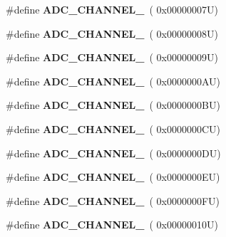 \begin{DoxyCompactItemize}
\#define {\bfseries A\+D\+C\+\_\+\+C\+H\+A\+N\+N\+E\+L\+\_}~( 0x00000007\+U)
\item 
\mbox{\label{group___a_d_c__channels_gab0917f6b66213f33f2e2ea8781df5aa9}} 
\#define {\bfseries A\+D\+C\+\_\+\+C\+H\+A\+N\+N\+E\+L\+\_}~( 0x00000008\+U)
\item 
\mbox{\label{group___a_d_c__channels_ga95f485ecc05187c3d475238a88beef1c}} 
\#define {\bfseries A\+D\+C\+\_\+\+C\+H\+A\+N\+N\+E\+L\+\_}~( 0x00000009\+U)
\item 
\mbox{\label{group___a_d_c__channels_gaa55df8c97225d32b495959896897567c}} 
\#define {\bfseries A\+D\+C\+\_\+\+C\+H\+A\+N\+N\+E\+L\+\_}~( 0x0000000\+A\+U)
\item 
\mbox{\label{group___a_d_c__channels_gaf36361a33c07b04f8ab1d58d232bc434}} 
\#define {\bfseries A\+D\+C\+\_\+\+C\+H\+A\+N\+N\+E\+L\+\_}~( 0x0000000\+B\+U)
\item 
\mbox{\label{group___a_d_c__channels_gad5ff4f4f0e5f6f9ffbdfb6f4cbc3a6e0}} 
\#define {\bfseries A\+D\+C\+\_\+\+C\+H\+A\+N\+N\+E\+L\+\_}~( 0x0000000\+C\+U)
\item 
\mbox{\label{group___a_d_c__channels_gad7550270d90a1a12b00cd9f8ad9f1fc2}} 
\#define {\bfseries A\+D\+C\+\_\+\+C\+H\+A\+N\+N\+E\+L\+\_}~( 0x0000000\+D\+U)
\item 
\mbox{\label{group___a_d_c__channels_ga9caff32bcda5dd83f662bf398ab14d36}} 
\#define {\bfseries A\+D\+C\+\_\+\+C\+H\+A\+N\+N\+E\+L\+\_}~( 0x0000000\+E\+U)
\item 
\mbox{\label{group___a_d_c__channels_ga66f41aad197a6de160dd8958c90653a2}} 
\#define {\bfseries A\+D\+C\+\_\+\+C\+H\+A\+N\+N\+E\+L\+\_}~( 0x0000000\+F\+U)
\item 
\mbox{\label{group___a_d_c__channels_ga7892590f524e7356deb1e513bbc0cdaf}} 
\#define {\bfseries A\+D\+C\+\_\+\+C\+H\+A\+N\+N\+E\+L\+\_}~( 0x00000010\+U)
\item 

\end{DoxyCompactItemize}
